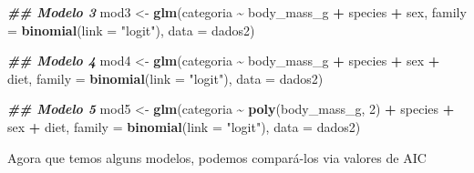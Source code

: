 \documentclass[
]{book}
\newenvironment{Shaded}{\begin{snugshade}}{\end{snugshade}}
\newcommand{\AttributeTok}[1]{\textcolor[rgb]{0.13,0.29,0.53}{#1}}
\newcommand{\DecValTok}[1]{\textcolor[rgb]{0.00,0.00,0.81}{#1}}
\newcommand{\DocumentationTok}[1]{\textcolor[rgb]{0.56,0.35,0.01}{\textbf{\textit{#1}}}}
\newcommand{\FunctionTok}[1]{\textcolor[rgb]{0.13,0.29,0.53}{\textbf{#1}}}
\newcommand{\NormalTok}[1]{#1}
\newcommand{\OtherTok}[1]{\textcolor[rgb]{0.56,0.35,0.01}{#1}}
\newcommand{\SpecialCharTok}[1]{\textcolor[rgb]{0.81,0.36,0.00}{\textbf{#1}}}
\newcommand{\StringTok}[1]{\textcolor[rgb]{0.31,0.60,0.02}{#1}}
\begin{document}
\begin{Shaded}
\begin{Highlighting}[]
\DocumentationTok{\#\# Modelo 3}
\NormalTok{mod3 }\OtherTok{\textless{}{-}} \FunctionTok{glm}\NormalTok{(categoria }\SpecialCharTok{\textasciitilde{}}\NormalTok{ body\_mass\_g }\SpecialCharTok{+}\NormalTok{ species }\SpecialCharTok{+}\NormalTok{ sex,}
            \AttributeTok{family =} \FunctionTok{binomial}\NormalTok{(}\AttributeTok{link =} \StringTok{"logit"}\NormalTok{),}
            \AttributeTok{data =}\NormalTok{ dados2)}

\DocumentationTok{\#\# Modelo 4}
\NormalTok{mod4 }\OtherTok{\textless{}{-}} \FunctionTok{glm}\NormalTok{(categoria }\SpecialCharTok{\textasciitilde{}}\NormalTok{ body\_mass\_g }\SpecialCharTok{+}\NormalTok{ species }\SpecialCharTok{+}\NormalTok{ sex }\SpecialCharTok{+}\NormalTok{ diet,}
            \AttributeTok{family =} \FunctionTok{binomial}\NormalTok{(}\AttributeTok{link =} \StringTok{"logit"}\NormalTok{),}
            \AttributeTok{data =}\NormalTok{ dados2)}

\DocumentationTok{\#\# Modelo 5}
\NormalTok{mod5 }\OtherTok{\textless{}{-}} \FunctionTok{glm}\NormalTok{(categoria }\SpecialCharTok{\textasciitilde{}} \FunctionTok{poly}\NormalTok{(body\_mass\_g, }\DecValTok{2}\NormalTok{) }\SpecialCharTok{+}\NormalTok{ species }\SpecialCharTok{+}\NormalTok{ sex }\SpecialCharTok{+}\NormalTok{ diet, }
            \AttributeTok{family =} \FunctionTok{binomial}\NormalTok{(}\AttributeTok{link =} \StringTok{"logit"}\NormalTok{),}
            \AttributeTok{data =}\NormalTok{ dados2)}
\end{Highlighting}
\end{Shaded}

Agora que temos alguns modelos, podemos compará-los via valores de AIC
\end{document}
